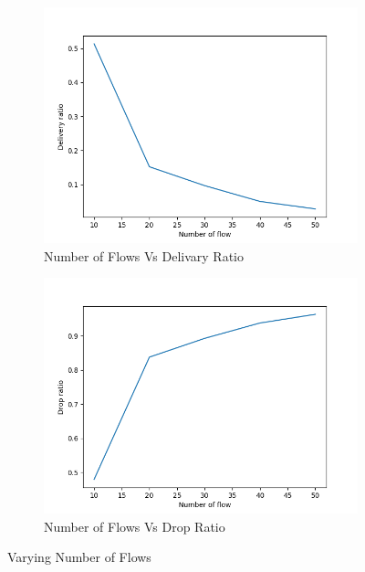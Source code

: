 \documentclass[14pt]{scrartcl} %
\begin{document}
\begin{figure}[h]
\begin{subfigure}{.5\textwidth}
    \includegraphics[width=.8\linewidth]{Graph/flowVsDeliveryRatio.png}
    \caption{Number of Flows Vs Delivary Ratio}
    \label{fig-7}
\end{subfigure}
\begin{subfigure}{.5\textwidth}
    \centering
    \includegraphics[width=.8\linewidth]{Graph/flowVsDropRatio.png}
    \caption{Number of Flows Vs Drop Ratio}
    \label{fig-8}
\end{subfigure}
\caption{Varying Number of Flows}
\label{fig:varyingFlow}
\end{figure}
\end{document}

